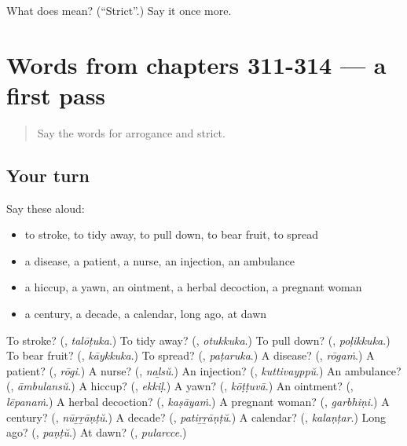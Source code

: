 \begin{tcolorbox}[breakable,colback=teal!4,colframe=teal!35!black,title={Before you move on}]
What does  mean? (\textquotedblleft{}Strict\textquotedblright{}.) Say it once more.
\end{tcolorbox}
\section[(dialogue)]{Words from chapters 311-314 — a first pass}

\label{lesson:ML-R319-first-pass-words-from-chapters-311-314}



\begin{quote}
Say the words for arrogance and strict.
\end{quote}

\subsection*{Your turn}
Say these aloud:

\begin{itemize}
\raggedright
  \item to stroke, to tidy away, to pull down, to bear fruit, to spread
  \item a disease, a patient, a nurse, an injection, an ambulance
  \item a hiccup, a yawn, an ointment, a herbal decoction, a pregnant woman
  \item a century, a decade, a calendar, long ago, at dawn
\end{itemize}

\begin{tcolorbox}[breakable,colback=teal!4,colframe=teal!35!black,title={Before you move on}]
To stroke? (\textbf{}, \emph{talōṭuka}.) To tidy away? (\textbf{}, \emph{otukkuka}.) To pull down? (\textbf{}, \emph{poḷikkuka}.) To bear fruit? (\textbf{}, \emph{kāykkuka}.) To spread? (\textbf{}, \emph{paṭaruka}.) A disease? (\textbf{}, \emph{rōgaṁ}.) A patient? (\textbf{}, \emph{rōgi}.) A nurse? (\textbf{}, \emph{naḻsŭ}.) An injection? (\textbf{}, \emph{kuttivayppŭ}.) An ambulance? (\textbf{}, \emph{āmbulansŭ}.) A hiccup? (\textbf{}, \emph{ekkiḷ}.) A yawn? (\textbf{}, \emph{kōṭṭuvā}.) An ointment? (\textbf{}, \emph{lēpanaṁ}.) A herbal decoction? (\textbf{}, \emph{kaṣāyaṁ}.) A pregnant woman? (\textbf{}, \emph{garbhiṇi}.) A century? (\textbf{}, \emph{nūṟṟāṇṭŭ}.) A decade? (\textbf{}, \emph{patiṟṟāṇṭŭ}.) A calendar? (\textbf{}, \emph{kalaṇṭar}.) Long ago? (\textbf{}, \emph{paṇṭŭ}.) At dawn? (\textbf{}, \emph{pularcce}.)
\end{tcolorbox}
